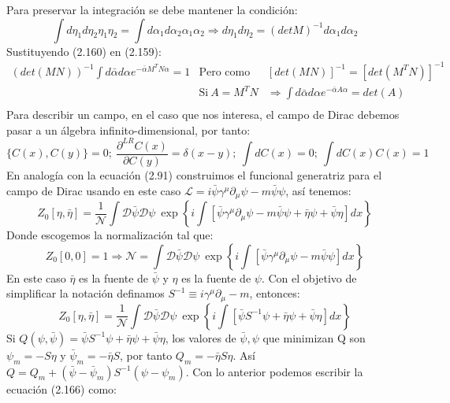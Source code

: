 Para preservar la integración se debe mantener la condición:
\begin{equation}
\int d\eta_{1}d\eta_{2}\eta_{1}\eta_{2}=\int d\alpha_{1}d\alpha_{2}\alpha_{1}\alpha_{2}\Rightarrow d\eta_{1}d\eta_{2}=(detM)^{-1}d\alpha_{1}d\alpha_{2}
\end{equation}
Sustituyendo (2.160) en (2.159):
\begin{eqnarray}
\nonumber (det(MN))^{-1}\int d\bar{\alpha}d\alpha e^{-\bar{\alpha}M^{T}N\alpha}=1&\text{Pero como}& \left[det(MN)\right]^{-1}=\left[det(M^{T}N)\right]^{-1}\\
\nonumber &\text{Si}\ A=M^TN&\Rightarrow \int d\bar{\alpha}d\alpha e^{-\bar{\alpha}A\alpha}=det(A)\\
\end{eqnarray}
Para describir un campo, en el caso que nos interesa, el campo de Dirac debemos pasar a un álgebra infinito-dimensional, por tanto:
\begin{equation}
\{C(x),C(y)\}=0; \ \frac{\partial^{LR}C(x)}{\partial C(y)}=\delta(x-y); \ \int dC(x)=0; \ \int dC(x)C(x)=1
\end{equation}
En analogía con la ecuación (2.91) construimos el funcional generatriz para el campo de Dirac usando en este caso $\mathcal{L}=i\bar{\psi}\gamma^{\mu}\partial_{\mu}\psi-m\bar{\psi}\psi$, así tenemos:
\begin{equation}
Z_{0}[\eta,\bar{\eta}]=\frac{1}{\mathcal{N}}\int\mathcal{D}\bar{\psi}\mathcal{\mathcal{D}}\psi\ \exp\left\{ i\int\left[\bar{\psi}\gamma^{\mu}\partial_{\mu}\psi-m\bar{\psi}\psi+\bar{\eta}\psi+\bar{\psi}\eta\right]dx\right\}
\end{equation}
Donde escogemos la normalización tal que:
\begin{equation}
Z_{0}[0,0]=1\Rightarrow\mathcal{N}=\int\mathcal{D}\bar{\psi}\mathcal{\mathcal{D}}\psi\ \exp\left\{ i\int\left[\bar{\psi}\gamma^{\mu}\partial_{\mu}\psi-m\bar{\psi}\psi\right]dx\right\} 
\end{equation}
En este caso $\bar{\eta}$ es la fuente de $\bar{\psi}$ y $\eta$ es la fuente de $\psi$. Con el objetivo de simplificar la notación definamos $S^{-1}\equiv i\gamma^{\mu}\partial_{\mu}-m$, entonces:
\begin{equation}
Z_{0}[\eta,\bar{\eta}]=\frac{1}{\mathcal{N}}\int\mathcal{D}\bar{\psi}\mathcal{\mathcal{D}}\psi\ \exp\left\{ i\int\left[\bar{\psi}S^{-1}\psi+\bar{\eta}\psi+\bar{\psi}\eta\right]dx\right\}
\end{equation} 
Si $Q(\psi,\bar{\psi})=\bar{\psi}S^{-1}\psi+\bar{\eta}\psi+\bar{\psi}\eta$, los valores de $\bar{\psi},\psi$ que minimizan Q son $\psi_m=-S\eta$ y $\bar{\psi}_m=-\bar{\eta}S$, por tanto $Q_m=-\bar{\eta}S\eta$. Así $Q=Q_m+(\bar{\psi}-\bar{\psi}_m)S^{-1}(\psi-\psi_m)$. Con lo anterior podemos escribir la ecuación (2.166) como:
